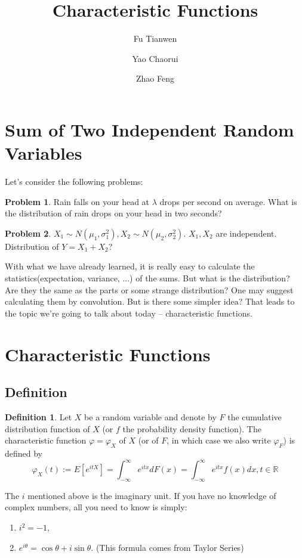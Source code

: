 \documentclass{article}
\title{Characteristic Functions}
\author{Fu Tianwen \and Yao Chaorui \and Zhao Feng}
\theoremstyle{definition}
\newtheorem{definition}{Definition}[section]
\newtheorem{problem}{Problem}
\theoremstyle{plain}
\theoremstyle{remark}
\newcommand{\reals}{\mathbb{R}}
\begin{document}
\maketitle
\section{Sum of Two Independent Random Variables}
Let's consider the following problems:
\begin{problem}
	Rain falls on your head at $\lambda$ drops per second on average. What is the distribution of rain drops on your head in two seconds?
	\label{prb:poisson}
\end{problem}
\begin{problem}
	$X_1\sim N(\mu_1,\sigma_1^2), X_2\sim N(\mu_2,\sigma_2^2).$ $X_1,X_2$ are independent. Distribution of $Y=X_1+X_2$?
	\label{prb:normal}
\end{problem}
\noindent With what we have already learned, it is really easy to calculate the statistics(expectation, variance, ...) of the sums. But what is the distribution? Are they the same as the parts or some strange distribution?
One may suggest calculating them by convolution. But is there some simpler idea?
That leads to the topic we're going to talk about today -- characteristic functions.
\section{Characteristic Functions}
\subsection{Definition}
\begin{definition}
	Let $X$ be a random variable and denote by $F$ the cumulative distribution function of $X$ (or $f$ the probability density function). The characteristic function $\varphi=\varphi_X$ of $X$ (or of $F$, in which case we also write $\varphi_F$) is defined by \cite{cfms}
	$$\varphi_X(t):=E[e^{itX}]=\int_{-\infty}^\infty e^{itx}dF(x)=\int_{-\infty}^\infty e^{itx}f(x)dx, t\in\reals$$
\end{definition}
\noindent The $i$ mentioned above is the imaginary unit. If you have no knowledge of complex numbers, all you need to know is simply:
\begin{enumerate}[$\ast$]
	\item $i^2=-1$,
	\item $e^{i\theta} = \cos\theta + i\sin\theta$. (This formula comes from Taylor Series)
\end{enumerate}
\end{document}
